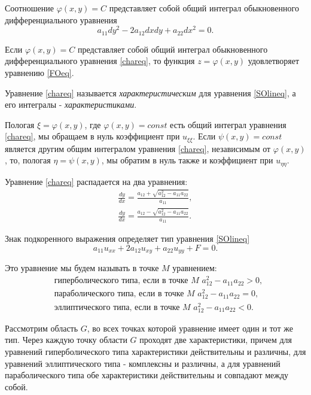 Соотношение $\varphi(x, y) = C$ представляет собой общий интеграл обыкновенного дифференциального уравнения 
\begin{equation} \label{chareq}
	a_{11} dy^2 - 2 a_{12} dx dy + a_{22} dx^2 = 0.
\end{equation}

Если $\varphi(x, y) = C$ представляет собой общий интеграл обыкновенного дифференциального уравнения \eqref{chareq}, то функция $z = \varphi(x, y)$ удовлетворяет уравнению \eqref{FOeq}. 

Уравнение \eqref{chareq} называется \textit{характеристическим} для уравнения \eqref{SOlineq}, а его интегралы - \textit{характеристиками}. 

Пологая $\xi = \varphi(x, y)$, где $\varphi(x, y) = const$ есть общий интеграл уравнения \eqref{chareq}, мы обращаем в нуль коэффициент при $u_{\xi\xi}$. Если $\psi(x, y) = const$ является другим общим интегралом уравнения \eqref{chareq}, независимым от $\varphi(x, y)$, то, пологая $\eta = \psi(x, y)$, мы обратим в нуль также и коэффициент при $u_{\eta\eta}$. 

Уравнение \eqref{chareq} распадается на два уравнения:
\begin{align}
	\frac{dy}{dx} = \frac{a_{12} + \sqrt{a_{12}^2 - a_{11} a_{22}}}{a_{11}}, \\
	\frac{dy}{dx} = \frac{a_{12} - \sqrt{a_{12}^2 - a_{11} a_{22}}}{a_{11}}.
\end{align}

Знак подкоренного выражения определяет тип уравнения \eqref{SOlineq}
\begin{equation*}
	a_{11} u_{xx} + 2 a_{12} u_{xy} + a_{22} u_{yy} + F = 0.
\end{equation*}

Это уравнение мы будем называть в точке $M$ уравнением:
\begin{align*}
	&\texttt{гиперболического } \text{типа, если в точке } M \, \, a_{12}^2 - a_{11} a_{22} > 0, \\
	&\texttt{параболического } \text{типа, если в точке } M \,\, a_{12}^2 - a_{11} a_{22} = 0, \\
	&\texttt{эллиптического } \text{типа, если в точке } M \,\, a_{12}^2 - a_{11} a_{22} < 0.
\end{align*}

Рассмотрим область $G$, во всех точках которой уравнение имеет один и тот же тип. Через каждую точку области $G$ проходят две характеристики, причем для уравнений гиперболического типа характеристики действительны и различны, для уравнений эллиптического типа - комплексны и различны, а для уравнений параболического типа обе характеристики действительны и совпадают между собой. 

